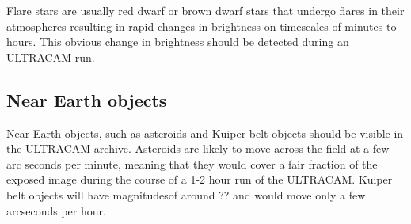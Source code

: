 Flare stars are usually red dwarf or brown dwarf stars that undergo flares in their atmospheres resulting in rapid changes in brightness on timescales of minutes to hours. This obvious change in brightness should be detected during an ULTRACAM run. 

\subsection{Near Earth objects}
Near Earth objects, such as asteroids and Kuiper belt objects should be visible in the ULTRACAM archive. Asteroids are likely to move across the field at a few arc seconds per minute, meaning that they would cover a fair fraction of the exposed image during the course of a 1-2 hour run of the ULTRACAM. Kuiper belt objects will have magnitudesof around ?? and would move only a few arcseconds per hour. 
